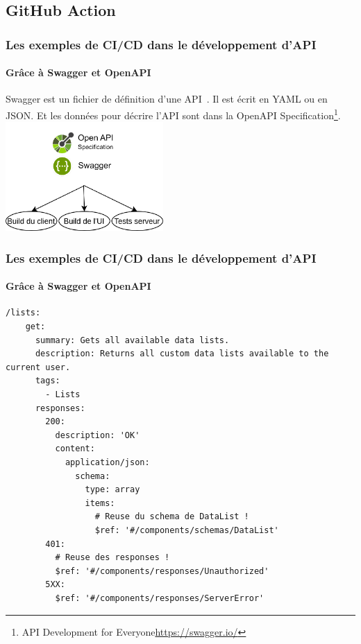 \documentclass{beamer}
\begin{document}
    \subsection{GitHub Action}\label{subsec:github-action}
    \begin{frame}
        \frametitle{Les exemples de CI/CD dans le développement d'API}
        \framesubtitle{Grâce à Swagger et OpenAPI}
        \transdissolve
        Swagger est un fichier de définition d'une API~.
        Il est écrit en YAML ou en JSON. Et les données pour décrire l'API sont dans la OpenAPI Specification\footnote{API Development for Everyone\url{https://swagger.io/}}.
        \break
        \centering
        \includegraphics[width=6cm]{image/swagger-capacity.drawio.png}
    \end{frame}

    \begin{frame}[fragile]
        \frametitle{Les exemples de CI/CD dans le développement d'API}
        \framesubtitle{Grâce à Swagger et OpenAPI}
        \transdissolve
        \begin{lstlisting}
/lists:
    get:
      summary: Gets all available data lists.
      description: Returns all custom data lists available to the current user.
      tags:
        - Lists
      responses:
        200:
          description: 'OK'
          content:
            application/json:
              schema:
                type: array
                items:
                  # Reuse du schema de DataList !
                  $ref: '#/components/schemas/DataList'
        401:
          # Reuse des responses !
          $ref: '#/components/responses/Unauthorized'
        5XX:
          $ref: '#/components/responses/ServerError'
        \end{lstlisting}
    \end{frame}
\end{document}
